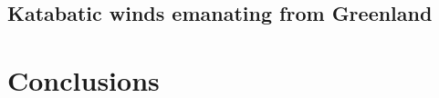 \documentclass[draft]{agujournal2019}
\begin{document}
\subsection{Katabatic winds emanating from Greenland}

%
%
%
%

\section{Conclusions}\label{sec:conclusions}
\end{document}
